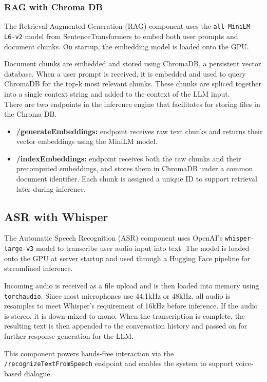 \documentclass[twocolumn]{article}
\begin{document}
\subsubsection{RAG with Chroma DB}
The Retrieval-Augmented Generation (RAG) component uses the \texttt{all-MiniLM-L6-v2} model from SentenceTransformers to embed both user prompts and document chunks. On startup, the embedding model is loaded onto the GPU.

Document chunks are embedded and stored using ChromaDB\cite{chromadb2023}, a persistent vector database. When a user prompt is received, it is embedded and used to query ChromaDB for the top-k most relevant chunks. These chunks are spliced together into a single context string and added to the context of the LLM input.\\
There are two endpoints in the inference engine that facilitates for storing files in the Chroma DB.
\begin{itemize}
    \item \textbf{/generateEmbeddings:} endpoint receives raw text chunks and returns their vector embeddings using the MiniLM model.
    \item \textbf{/indexEmbeddings:} endpoint receives both the raw chunks and their precomputed embeddings, and stores them in ChromaDB under a common document identifier. Each chunk is assigned a unique ID to support retrieval later during inference.
\end{itemize}

\subsection{ASR with Whisper}
The Automatic Speech Recognition (ASR) component uses OpenAI’s \texttt{whisper-large-v3}\cite{radford2022whisper} model to transcribe user audio input into text. The model is loaded onto the GPU at server startup and used through a Hugging Face pipeline for streamlined inference.

Incoming audio is received as a file upload and is then loaded into memory using \texttt{torchaudio}\cite{torchaudio}. Since most microphones use 44.1kHz or 48kHz, all audio is resamples to meet Whisper's requirement of 16kHz before inference. If the audio is stereo, it is down-mixed to mono. When the transcription is complete, the resulting text is then appended to the conversation history and passed on for further response generation for the LLM.

This component powers hands-free interaction via the \texttt{/recognizeTextFromSpeech} endpoint and enables the system to support voice-based dialogue.
\end{document}
